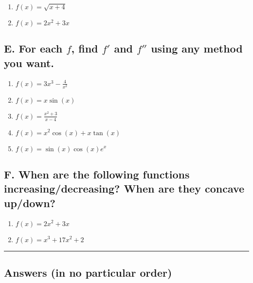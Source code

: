 \documentclass{article}
\begin{document}
\begin{enumerate}
\item $f(x)=\sqrt{x+4}$
\item $f(x)=2x^2 + 3x$
\end{enumerate}

\subsection*{E. For each $f$, find $f'$ and $f''$ using any method you want.}

\begin{enumerate}
\item $f(x)=3x^3-\frac{4}{x^2}$
\item $f(x)=x\sin(x)$
\item $f(x)=\frac{x^2+3}{x-4}$
\item $f(x)=x^2\cos(x)+x\tan(x)$
\item $f(x)=\sin(x)\cos(x)e^x$
\end{enumerate}

\subsection*{F. When are the following functions increasing/decreasing? When are they concave up/down?}

\begin{enumerate}
\item $f(x)=2x^2+3x$
\item $f(x)=x^3+17x^2+2$
\end{enumerate}

\noindent\hrule

\subsection*{Answers (in no particular order)}
\end{document}
